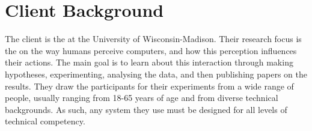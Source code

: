 \section{Client Background}
The client is the  at the University of Wisconsin-Madison. Their research focus is the on the way humans perceive computers, and how this perception influences their actions. The main goal is to learn about this interaction through making hypotheses, experimenting, analysing the data, and then publishing papers on the results.  They draw the participants for their experiments from a wide range of people, usually ranging from 18-65 years of age and from diverse technical backgrounds.  As such, any system they use must be designed for all levels of technical competency.